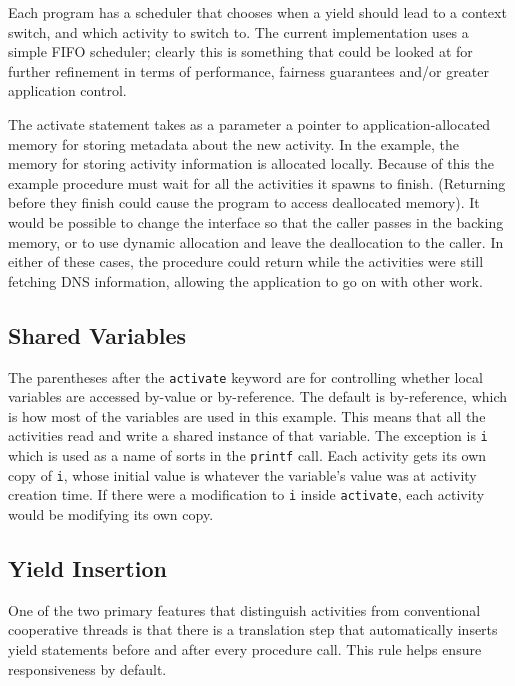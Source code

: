 \documentclass[acmsmall,anonymous,review]{acmart}\settopmatter{printfolios=true,printccs=false,printacmref=false}
\begin{document}
Each \charcoal{} program has a scheduler that chooses when a yield should lead to a context switch, and which activity to switch to.
The current \charcoal{} implementation uses a simple FIFO scheduler; clearly this is something that could be looked at for further refinement in terms of performance, fairness guarantees and/or greater application control.

The activate statement takes as a parameter a pointer to application-allocated memory for storing metadata about the new activity.
In the example, the memory for storing activity information is allocated locally.
Because of this the example procedure must wait for all the activities it spawns to finish.
(Returning before they finish could cause the program to access deallocated memory).
It would be possible to change the interface so that the caller passes in the backing memory, or to use dynamic allocation and leave the deallocation to the caller.
In either of these cases, the procedure could return while the activities were still fetching DNS information, allowing the application to go on with other work.

\subsection{Shared Variables}

The parentheses after the \texttt{activate} keyword are for controlling whether local variables are accessed by-value or by-reference.
The default is by-reference, which is how most of the variables are used in this example.
This means that all the activities read and write a shared instance of that variable.
The exception is \texttt{i} which is used as a name of sorts in the \texttt{printf} call.
Each activity gets its own copy of \texttt{i}, whose initial value is whatever the variable's value was at activity creation time.
If there were a modification to \texttt{i} inside \texttt{activate}, each activity would be modifying its own copy.

\subsection{Yield Insertion}

One of the two primary features that distinguish activities from conventional cooperative threads is that there is a translation step that automatically inserts yield statements before and after every procedure call.
This rule helps ensure responsiveness by default.
\end{document}
